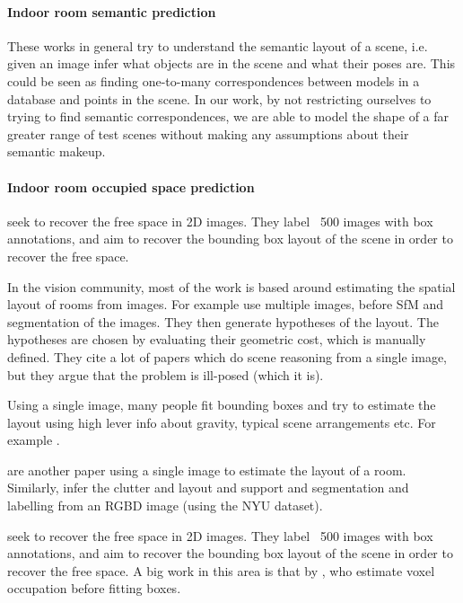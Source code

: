 \documentclass[10pt,a4paper, twocolumn]{article}
\makeatletter
\newcommand*{\ie}{i.e.\@\xspace}
\makeatother
\begin{document}
\paragraph{Indoor room semantic prediction}
These works in general try to understand the semantic layout of a scene, \ie given an image infer what objects are in the scene and what their poses are.
\cite{nan-acm-2012, minkim-siggraphasia-2012}
This could be seen as finding one-to-many correspondences between models in a database and points in the scene.
In our work, by not restricting ourselves to trying to find semantic correspondences, we are able to model the shape of a far greater range of test scenes without making any assumptions about their semantic makeup.

\paragraph{Indoor room occupied space prediction}
\cite{hedau-cvpr-2012} seek to recover the free space in 2D images. They label ~500 images with box annotations, and aim to recover the bounding box layout of the scene in order to recover the free space.

In the vision community, most of the work is based around estimating the spatial layout of rooms from images.
For example \cite{bao-wacv-2014} use multiple images, before SfM and segmentation of the images. 
They then generate hypotheses of the layout. 
The hypotheses are chosen by evaluating their geometric cost, which is manually defined. 
They cite a lot of papers which do scene reasoning from a single image, but they argue that the problem is ill-posed (which it is). 

Using a single image, many people fit bounding boxes and try to estimate the layout using high lever info about gravity, typical scene arrangements etc. 
For example \cite{choi-cvpr-2013}.

\cite{lee-nips-2010} are another paper using a single image to estimate the layout of a room. 
Similarly, \cite{zhang-iccv-2013} infer the clutter and layout and support and segmentation and labelling from an RGBD image (using the NYU dataset).

\cite{hedau-cvpr-2012} seek to recover the free space in 2D images. 
They label ~500 images with box annotations, and aim to recover the bounding box layout of the scene in order to recover the free space. 
A big work in this area is that by \cite{gupta-cvpr-2011}, who estimate voxel occupation before fitting boxes.
\end{document}

